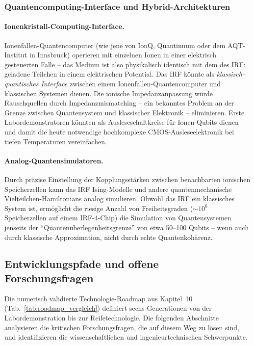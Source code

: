 ﻿\documentclass[a4paper,12pt]{scrreprt}
\theoremstyle{definition}
\begin{document}
\subsubsection{Quantencomputing-Interface und Hybrid-Architekturen}
\label{subsubsec:quantum}

\paragraph{Ionenkristall-Computing-Interface.}
Ionenfallen-Quantencomputer (wie jene von IonQ, Quantinuum oder dem
AQT-Institut in Innsbruck) operieren mit einzelnen Ionen in einer
elektrisch gesteuerten Falle -- das Medium ist also physikalisch identisch
mit dem des IRF: geladene Teilchen in einem elektrischen Potential.
Das IRF könnte als \emph{klassisch-quantisches Interface} zwischen einem
Ionenfallen-Quantencomputer und klassischen Systemen dienen. Die ionische
Impedanzanpassung würde Rauschquellen durch Impedanzmismatching
-- ein bekanntes Problem an der Grenze zwischen Quantensystem und
klassischer Elektronik -- eliminieren. Erste Labordemonstratoren
könnten als Ausleseschaltkreise für Ionen-Qubits dienen und
damit die heute notwendige hochkomplexe CMOS-Ausleseelektronik
bei tiefen Temperaturen vereinfachen.

\paragraph{Analog-Quantensimulatoren.}
Durch präzise Einstellung der Kopplungsstärken zwischen benachbarten
ionischen Speicherzellen kann das IRF Ising-Modelle und andere
quantenmechanische Vielteilchen-Hamiltonians analog simulieren.
Obwohl das IRF ein klassisches System ist, ermöglicht die riesige
Anzahl von Freiheitsgraden ($\sim 10^6$ Speicherzellen auf einem
IRF-4-Chip) die Simulation von Quantensystemen jenseits der
``Quantenüberlegenheitsgrenze'' von etwa 50--100 Qubits -- wenn auch
durch klassische Approximation, nicht durch echte Quantenkohärenz.

\subsection{Entwicklungspfade und offene Forschungsfragen}
\label{sec:forschungsausblick}

Die numerisch validierte Technologie-Roadmap aus Kapitel~10
(Tab.~\ref{tab:roadmap_vergleich}) definiert sechs Generationen von
der Labordemonstration bis zur Reifetechnologie. Die folgenden
Abschnitte analysieren die kritischen Forschungsfragen, die auf
diesem Weg zu lösen sind, und identifizieren die wissenschaftlichen
und ingenieurtechnischen Schwerpunkte.
\end{document}
